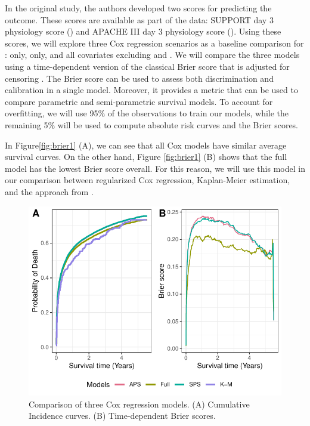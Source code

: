 \documentclass[
]{jss}
\begin{document}
In the original study, the authors developed two scores for predicting
the outcome. These scores are available as part of the data: SUPPORT day
3 physiology score () and APACHE III day 3 physiology score
(). Using these scores, we will explore three Cox regression
scenarios as a baseline comparison for :  only,
 only, and all covariates excluding  and .
We will compare the three models using a time-dependent version of the
classical Brier score that is adjusted for censoring
\citep{graf1999ass}. The Brier score can be used to assess both
discrimination and calibration in a single model. Moreover, it provides
a metric that can be used to compare parametric and semi-parametric
survival models. To account for overfitting, we will use 95\% of the
observations to train our models, while the remaining 5\% will be used
to compute absolute risk curves and the Brier scores.

In Figure\ref{fig:brier1} (A), we can see that all Cox models have
similar average survival curves. On the other hand, Figure
\ref{fig:brier1} (B) shows that the full model has the lowest Brier
score overall. For this reason, we will use this model in our comparison
between regularized Cox regression, Kaplan-Meier estimation, and the
approach from .

\begin{CodeChunk}
\begin{figure}

{\centering \includegraphics{../figures/brierpt1-1} 

}

\caption{\label{fig:brier1} Comparison of three Cox regression models. (A) Cumulative Incidence curves. (B) Time-dependent Brier scores.}\label{fig:brierpt1}
\end{figure}
\end{CodeChunk}
\end{document}
